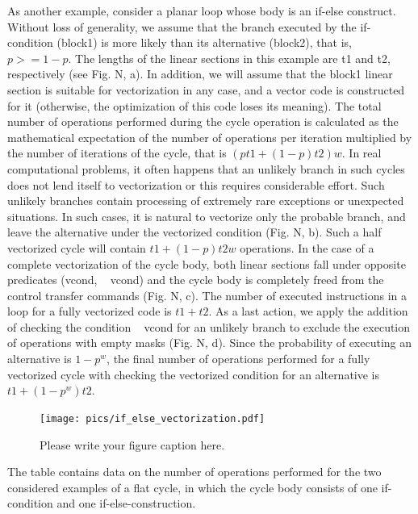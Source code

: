 \documentclass[
11pt,%
tightenlines,%
twoside,%
onecolumn,%
nofloats,%
nobibnotes,%
nofootinbib,%
superscriptaddress,%
noshowpacs,%
centertags]%
{revtex4}
\begin{document}
As another example, consider a planar loop whose body is an if-else construct. Without loss of generality, we assume that the branch executed by the if-condition (block1) is more likely than its alternative (block2), that is, $p> = 1 - p$. The lengths of the linear sections in this example are t1 and t2, respectively (see Fig. N, a). In addition, we will assume that the block1 linear section is suitable for vectorization in any case, and a vector code is constructed for it (otherwise, the optimization of this code loses its meaning). The total number of operations performed during the cycle operation is calculated as the mathematical expectation of the number of operations per iteration multiplied by the number of iterations of the cycle, that is $(pt1 + (1 - p) t2) w$. In real computational problems, it often happens that an unlikely branch in such cycles does not lend itself to vectorization or this requires considerable effort. Such unlikely branches contain processing of extremely rare exceptions or unexpected situations. In such cases, it is natural to vectorize only the probable branch, and leave the alternative under the vectorized condition (Fig. N, b). Such a half vectorized cycle will contain $t1 + (1 - p) t2w$ operations. In the case of a complete vectorization of the cycle body, both linear sections fall under opposite predicates (vcond, ~ vcond) and the cycle body is completely freed from the control transfer commands (Fig. N, c). The number of executed instructions in a loop for a fully vectorized code is $t1 + t2$. As a last action, we apply the addition of checking the condition ~ vcond for an unlikely branch to exclude the execution of operations with empty masks (Fig. N, d). Since the probability of executing an alternative is $1 - p ^ w$, the final number of operations performed for a fully vectorized cycle with checking the vectorized condition for an alternative is $t1 + (1 - p ^ w) t2$.

\begin{figure}[h]
\setcaptionmargin{5mm}
\onelinecaptionstrue  %
\texttt{[image: pics/if\_else\_vectorization.pdf]}
\caption{Please write your figure caption here.}\label{fig:1}
\end{figure}

The table contains data on the number of operations performed for the two considered examples of a flat cycle, in which the cycle body consists of one if-condition and one if-else-construction.
\end{document}
